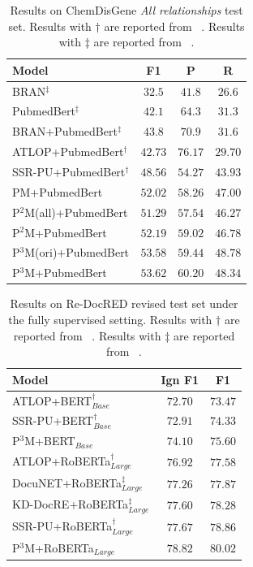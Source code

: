\documentclass[letterpaper]{article} %
\begin{document}
\begin{table}[!ht]
\centering
\begin{tabular}{lccc}
\toprule
\textbf{Model} & F1 & P & R \\
\midrule BRAN$^{\ddagger}$ & $32.5$ & $41.8$ & $26.6$ \\
PubmedBert$^{\ddagger}$ & $42.1$ & $64.3$ & $31.3$ \\
BRAN+PubmedBert$^{\ddagger}$ & $43.8$ & $70.9$ & $31.6$ \\
\midrule
ATLOP+PubmedBert$^{\dagger}$ & $42.73$ & $\mathbf{76.17} $ & $29.70$ \\
SSR-PU+PubmedBert$^{\dagger}$ & $48.56$ & $54.27$ & $43.93$ \\
PM+PubmedBert & $52.02$ & $58.26$ & $47.00$ \\
P$^{2}$M(all)+PubmedBert & $51.29$ & $57.54$ & $46.27$ \\
P$^{2}$M+PubmedBert & $52.19$ & $59.02$ & $46.78$ \\
P$^{3}$M(ori)+PubmedBert & $53.58$ & $59.44$ & $\mathbf{48.78}$ \\
P$^{3}$M+PubmedBert & $\mathbf{53.62}$ & $60.20$ & $48.34$ \\
\bottomrule
\end{tabular}
\caption{
Results on ChemDisGene \emph{All relationships} test set. Results with $\dagger$ are reported from ~\cite{DBLP:conf/emnlp/WangLHZ22}. Results with $\ddagger$ are reported from ~\cite{DBLP:conf/lrec/ZhangMTM22}.
}
\label{tab3}
\end{table}

\begin{table}
\centering
\begin{tabular}{lcc}
\toprule \textbf{Model} & Ign F1 & F1 \\
\midrule ATLOP+BERT$_{Base}^{\dagger}$ & $72.70$ & $73.47$ \\
SSR-PU+BERT$_{Base}^{\dagger}$ & $72.91$ & $74.33$ \\
P$^{3}$M+BERT$_{Base}$ & $\mathbf{74.10}$ & $\mathbf{75.60}$ \\
\midrule ATLOP+RoBERTa$_{Large}^{\dagger}$ & $76.92$ & $77.58$ \\
DocuNET+RoBERTa$_{Large}^{\ddagger}$ & $77.26$ & $77.87$ \\
KD-DocRE+RoBERTa$_{Large}^{\ddagger}$ & $77.60$ & $78.28$ \\
SSR-PU+RoBERTa$_{Large}^{\dagger}$ & $77.67$ & $78.86$ \\
P$^{3}$M+RoBERTa$_{Large}$ & $\mathbf{78.82}$ & $\mathbf{80.02}$ \\
\bottomrule
\end{tabular}
\caption{Results on Re-DocRED revised test set under the fully supervised setting. Results with $\dagger$ are reported from ~\cite{DBLP:conf/emnlp/WangLHZ22}. Results with $\ddagger$ are reported from ~\cite{DBLP:conf/emnlp/Tan0BNA22}.
}
\label{tab4}
\end{table}
\end{document}
